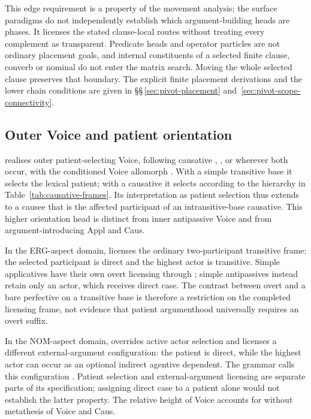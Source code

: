 This edge requirement is a property of the movement analysis; the surface
 paradigms do not independently establish which argument-building heads are
 phases. It licenses the stated clause-local routes without treating every
 complement as transparent. Predicate heads and operator particles are not
 ordinary placement goals, and internal constituents of a selected finite
 clause, converb or nominal do not enter the matrix search. Moving the whole
 selected clause preserves that boundary. The explicit finite placement
 derivations and the lower chain conditions are given in
 §§\,\ref{sec:pivot-placement} and~\ref{sec:pivot-scope-connectivity}.

\subsection{Outer Voice and patient orientation}
\label{sec:vm-n}

 realises outer patient-selecting Voice, following causative
, , or  wherever both occur,
with the conditioned Voice allomorph . With a simple transitive base it
selects the
lexical patient; with a causative it selects according to the hierarchy in
Table~\ref{tab:causative-frames}. Its interpretation as patient selection thus
extends to a causee that is the affected participant of an intransitive-base
causative. This higher orientation head is distinct from inner antipassive
Voice and from argument-introducing Appl and Caus.

In the ERG-aspect domain,  licenses the ordinary two-participant
transitive frame: the selected participant is direct and the highest actor is
transitive. Simple applicatives have their own overt licensing through
; simple antipassives instead retain only an actor, which receives
direct case. The contrast between overt  and a bare perfective on a
transitive base is therefore a restriction on the completed licensing frame,
not evidence that patient argumenthood universally requires an overt suffix.

In the NOM-aspect domain,  overrides active actor selection and
licenses a different external-argument configuration: the patient is direct,
while the highest actor can occur as an optional indirect agentive dependent.
The grammar calls this configuration . Patient selection and
external-argument licensing are separate parts of its specification; assigning
direct case to a patient alone would not establish the latter property.
The relative height of Voice accounts for  without
metathesis of Voice and Caus.

